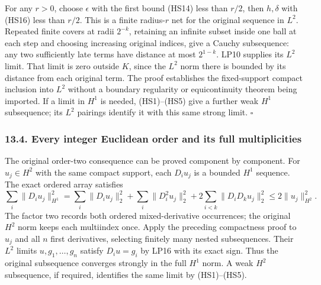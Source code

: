 \documentclass[
  11pt,
]{article}
\begin{document}
For any \(r>0\), choose \(\epsilon\) with the first bound (HS14) less
than \(r/2\), then \(h,\delta\) with (HS16) less than \(r/2\). This is a
finite radius-\(r\) net for the original sequence in \(L^2\). Repeated
finite covers at radii \(2^{-k}\), retaining an infinite subset inside
one ball at each step and choosing increasing original indices, give a
Cauchy subsequence: any two sufficiently late terms have distance at
most \(2^{1-k}\). LP10 supplies its \(L^2\) limit. That limit is zero
outside \(K\), since the \(L^2\) norm there is bounded by its distance
from each original term. The proof establishes the fixed-support compact
inclusion into \(L^2\) without a boundary regularity or equicontinuity
theorem being imported. If a limit in \(H^1\) is needed, (HS1)--(HS5)
give a further weak \(H^1\) subsequence; its \(L^2\) pairings identify
it with this same strong limit. \(\square\)

\subsubsection{13.4. Every integer Euclidean order and its full
multiplicities}\label{every-integer-euclidean-order-and-its-full-multiplicities}

The original order-two consequence can be proved component by component.
For \(u_j\in H^2\) with the same compact support, each \(D_i u_j\) is a
bounded \(H^1\) sequence. The exact ordered array satisfies \[
 \sum_i\|D_i u_j\|_{H^1}^2
   =\sum_i\|D_i u_j\|_2^2
      +\sum_i\|D_i^2u_j\|_2^2
      +2\sum_{i<k}\|D_iD_k u_j\|_2^2
   \leq2\|u_j\|_{H^2}^2 .                                    \tag{HS17}
\] The factor two records both ordered mixed-derivative occurrences; the
original \(H^2\) norm keeps each multiindex once. Apply the preceding
compactness proof to \(u_j\) and all \(n\) first derivatives, selecting
finitely many nested subsequences. Their \(L^2\) limits
\(u,g_1,\ldots,g_n\) satisfy \(D_i u=g_i\) by LP16 with its exact sign.
Thus the original subsequence converges strongly in the full \(H^1\)
norm. A weak \(H^2\) subsequence, if required, identifies the same limit
by (HS1)--(HS5).
\end{document}
